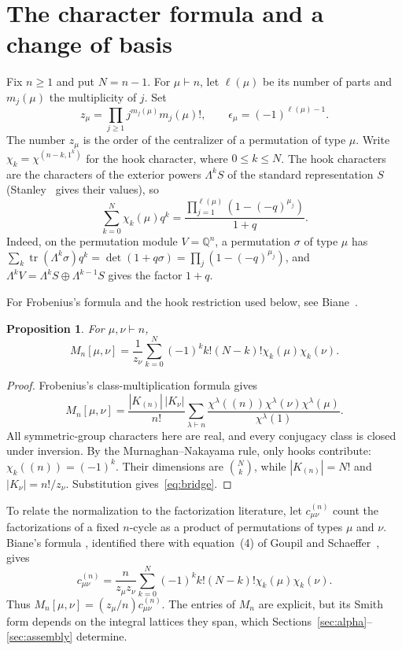 \documentclass[11pt]{article}
\newtheorem{proposition}[theorem]{Proposition}
\theoremstyle{remark}
\newcommand{\Q}{\mathbb{Q}}
\begin{document}
\section{The character formula and a change of basis}\label{sec:characters}
Fix $n\geq1$ and put $N=n-1$. For $\mu\vdash n$, let $\ell(\mu)$ be
its number of parts and $m_j(\mu)$ the multiplicity of $j$. Set
\[
 z_\mu=\prod_{j\geq1}j^{m_j(\mu)}m_j(\mu)!,\qquad
 \epsilon_\mu=(-1)^{\ell(\mu)-1}.
\]
The number $z_\mu$ is the order of the centralizer of a permutation of
type $\mu$. Write $\chi_k=\chi^{(n-k,1^k)}$ for the hook character,
where $0\leq k\leq N$. The hook characters are the characters of the
exterior powers $\Lambda^kS$ of the standard representation $S$
(Stanley~\cite[Lemma 2.2]{StanleyFactorizations} gives their values), so
\begin{equation}\label{eq:hook}
 \sum_{k=0}^N\chi_k(\mu)q^k
 =\frac{\prod_{j=1}^{\ell(\mu)}(1-(-q)^{\mu_j})}{1+q}.
\end{equation}
Indeed, on the permutation module $V=\Q^n$, a permutation $\sigma$ of
type $\mu$ has $\sum_k\operatorname{tr}(\Lambda^k\sigma)q^k=\det(1+q\sigma)
=\prod_j(1-(-q)^{\mu_j})$, and $\Lambda^kV=\Lambda^kS\oplus\Lambda^{k-1}S$
gives the factor $1+q$.

For Frobenius's formula and the hook restriction used below, see
Biane~\cite[equations (1)--(2) and the intervening hook restriction]{Biane}.

\begin{proposition}\label{prop:bridge}
For $\mu,\nu\vdash n$,
\begin{equation}\label{eq:bridge}
 M_n[\mu,\nu]=\frac1{z_\nu}\sum_{k=0}^N
       (-1)^k k!(N-k)!\chi_k(\mu)\chi_k(\nu).
\end{equation}
\end{proposition}
\begin{proof}
Frobenius's class-multiplication formula gives
\[
 M_n[\mu,\nu]=\frac{|K_{(n)}|\,|K_\nu|}{n!}
 \sum_{\lambda\vdash n}
 \frac{\chi^\lambda((n))\chi^\lambda(\nu)\chi^\lambda(\mu)}{\chi^\lambda(1)}.
\]
All symmetric-group characters here are real, and every conjugacy class
is closed under inversion. By the Murnaghan--Nakayama rule, only hooks
contribute: $\chi_k((n))=(-1)^k$. Their dimensions are
$\binom Nk$, while $|K_{(n)}|=N!$ and $|K_\nu|=n!/z_\nu$.
Substitution gives~\eqref{eq:bridge}.
\end{proof}

To relate the normalization to the factorization literature, let
$c^{(n)}_{\mu\nu}$ count the factorizations of a fixed $n$-cycle as
a product of permutations of types $\mu$ and $\nu$. Biane's formula
\cite[equation (2)]{Biane}, identified there with equation~(4) of
Goupil and Schaeffer~\cite{GoupilSchaeffer}, gives
\[
 c^{(n)}_{\mu\nu}=\frac{n}{z_\mu z_\nu}
 \sum_{k=0}^N(-1)^k k!(N-k)!\chi_k(\mu)\chi_k(\nu).
\]
Thus $M_n[\mu,\nu]=(z_\mu/n)c^{(n)}_{\mu\nu}$. The entries of $M_n$
are explicit, but its Smith form depends on the integral lattices they
span, which Sections~\ref{sec:alpha}--\ref{sec:assembly} determine.
\end{document}
